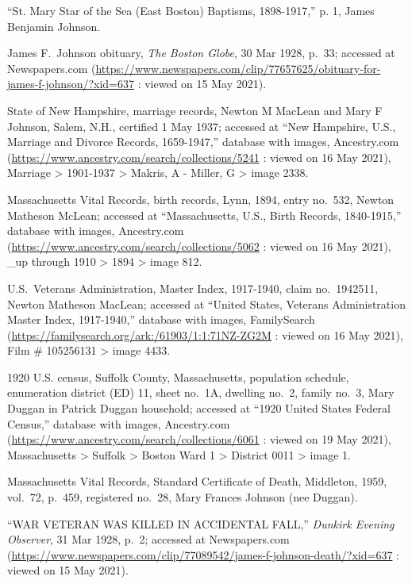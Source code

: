 \begin{thebibliography}{999}
``St. Mary Star of the Sea (East Boston) Baptisms, 1898-1917,'' p. 1, James Benjamin Johnson.

James F.\ Johnson obituary, \textit{The Boston Globe}, 30 Mar 1928, p.\ 33; accessed at Newspapers.com (\url{https://www.newspapers.com/clip/77657625/obituary-for-james-f-johnson/?xid=637} : viewed on 15 May 2021).

State of New Hampshire, marriage records, Newton M MacLean and Mary F Johnson, Salem, N.H., certified 1 May 1937; accessed at ``New Hampshire, U.S., Marriage and Divorce Records, 1659-1947,'' database with images, Ancestry.com (\url{https://www.ancestry.com/search/collections/5241} : viewed on 16 May 2021), Marriage > 1901-1937 > Makris, A - Miller, G > image 2338.

Massachusetts Vital Records, birth records, Lynn, 1894, entry no.\ 532, Newton Matheson McLean; accessed at ``Massachusetts, U.S., Birth Records, 1840-1915,'' database with images, Ancestry.com (\url{https://www.ancestry.com/search/collections/5062} : viewed on 16 May 2021), \_up through 1910 > 1894 > image 812.

U.S.\ Veterans Administration, Master Index, 1917-1940, claim no.\ 1942511, Newton Matheson MacLean; accessed at ``United States, Veterans Administration Master Index, 1917-1940,'' database with images, FamilySearch (\url{https://familysearch.org/ark:/61903/1:1:71NZ-ZG2M} : viewed on 16 May 2021), Film \# 105256131 > image 4433.

1920 U.S. census, Suffolk County, Massachusetts, population schedule, enumeration district (ED) 11, sheet no.\ 1A, dwelling no.\ 2, family no.\ 3, Mary Duggan in Patrick Duggan household; accessed at ``1920 United States Federal Census,'' database with images, Ancestry.com (\url{https://www.ancestry.com/search/collections/6061} : viewed on 19 May 2021), Massachusetts > Suffolk > Boston Ward 1 > District 0011 > image 1.

Massachusetts Vital Records, Standard Certificate of Death, Middleton, 1959, vol.\ 72, p.\ 459, registered no.\ 28, Mary Frances Johnson (nee Duggan).

``WAR VETERAN WAS KILLED IN ACCIDENTAL FALL,'' \textit{Dunkirk Evening Observer}, 31 Mar 1928, p.\ 2; accessed at Newspapers.com (\url{https://www.newspapers.com/clip/77089542/james-f-johnson-death/?xid=637} : viewed on 15 May 2021).


\end{thebibliography}
